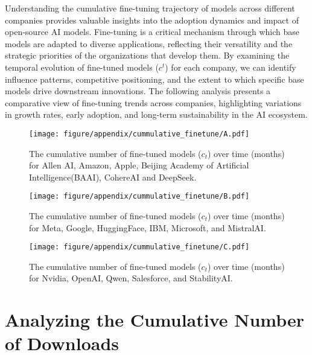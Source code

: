 \documentclass{article} %
\begin{document}
Understanding the cumulative fine-tuning trajectory of models across different companies provides valuable insights into the adoption dynamics and impact of open-source AI models. Fine-tuning is a critical mechanism through which base models are adapted to diverse applications, reflecting their versatility and the strategic priorities of the organizations that develop them. By examining the temporal evolution of fine-tuned models ($c^t$) for each company, we can identify influence patterns, competitive positioning, and the extent to which specific base models drive downstream innovations. The following analysis presents a comparative view of fine-tuning trends across companies, highlighting variations in growth rates, early adoption, and long-term sustainability in the AI ecosystem.
\begin{figure}[ht]
    \begin{center}
        \texttt{[image: figure/appendix/cummulative\_finetune/A.pdf]}
    \end{center}
    \caption{The cumulative number of fine-tuned models (\( c_t \)) over time (months) for Allen AI, Amazon, Apple, Beijing Academy of Artificial Intelligence(BAAI), CohereAI and DeepSeek. }
    \label{fig:A_num_finetuned_company}
\end{figure}
\begin{figure}[ht]
    \begin{center}
        \texttt{[image: figure/appendix/cummulative\_finetune/B.pdf]}
    \end{center}
    \caption{The cumulative number of fine-tuned models (\( c_t \)) over time (months) for Meta, Google, HuggingFace, IBM, Microsoft, and MistralAI.}
    \label{fig:B_num_finetuned_company}
\end{figure}
\begin{figure}[ht]
    \begin{center}
        \texttt{[image: figure/appendix/cummulative\_finetune/C.pdf]}
    \end{center}
    \caption{The cumulative number of fine-tuned models (\( c_t \)) over time (months) for Nvidia, OpenAI, Qwen, Salesforce, and StabilityAI.}
    \label{fig:C_num_finetuned_company}
\end{figure}

\section{Analyzing the Cumulative Number of Downloads} \label{sec:downloads}
	
\end{document}
